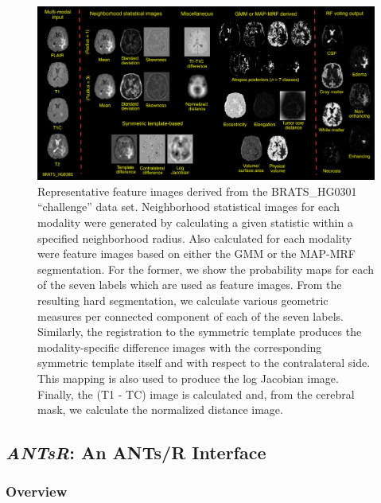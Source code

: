 \documentclass[preprint,authoryear,review,12pt]{elsarticle}
\begin{document}
\begin{figure}[h]
  \includegraphics[width=150mm]{Figures/featureImages.pdf}
  \caption{Representative feature images derived from the 
           BRATS\_HG0301  ``challenge'' data set.
           Neighborhood statistical images for each modality were 
           generated by calculating a given statistic within
           a specified neighborhood radius.  Also calculated for each modality were feature
           images based on either the GMM or the MAP-MRF segmentation.  For the former, we
           show the probability maps for each of the seven labels which are used as feature
           images.  From the resulting hard segmentation, we calculate various geometric 
           measures per connected component of each of the seven labels.  Similarly, the 
           registration to the symmetric template produces the modality-specific 
           difference images with the
           corresponding symmetric template itself and with respect to the 
           contralateral side.   
           This mapping is also used to produce the log Jacobian image.  Finally, the 
           (T1 - TC) image is calculated and, from the
           cerebral mask, we calculate the normalized distance image.  
           }
  \label{fig:featureImages}         
\end{figure}


\subsection{\textit{ANTsR}:  An ANTs/R Interface}

\subsubsection{Overview}
\end{document}
